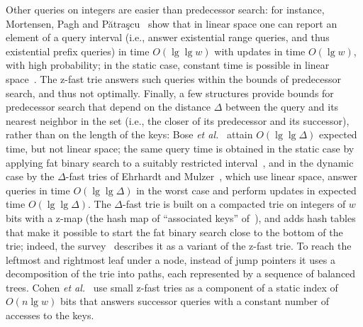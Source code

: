 \documentclass[a4paper]{article}
\newcommand{\?}{\mskip1.5mu}
\begin{document}
Other queries on integers are easier than predecessor search: for instance, Mortensen, Pagh and P\u{a}tra\c{s}cu~\cite{Mortensen2005Dynamic} 
show that in linear space one can report an element of a query interval (i.e., answer existential range queries, and thus existential prefix
queries) in time $O(\lg\lg w)$ with updates in time $O(\lg w)$, with high probability; in the static case, constant time is possible in linear space~\cite{Alstrup2001Optimal}. The z-fast trie answers 
such queries within the bounds of predecessor search, and thus not optimally.
Finally, a few structures provide bounds for predecessor search that depend on the distance $\Delta$ between the query and its nearest neighbor in the set (i.e., the closer of its predecessor and its successor),
rather than on the length of the keys: Bose \textit{et al.}~\cite{Bose2013Fast} attain $O(\lg\lg\Delta)$ expected time, but not linear space; 
the same query time is obtained in the static case by applying fat binary search to a suitably restricted interval~\cite{Belazzougui2012Predecessor},
and in the dynamic case by the $\Delta$-fast tries of Ehrhardt and Mulzer~\cite{Ehrhardt2017Delta}, which use linear space, 
answer queries in time $O(\lg\lg\Delta)$ in the worst case and perform updates in expected time $O(\lg\lg\Delta)$. 
The $\Delta$-fast trie is built on a compacted trie on integers of $w$ bits with a z-map (the hash map of ``associated keys'' of~\cite{Ehrhardt2017Delta}), 
and adds hash tables that make it possible to start the fat binary search close to the bottom of the trie; indeed, the 
survey~\cite{Navarro2020Predecessor} describes it as a variant of the z-fast trie. 
To reach the leftmost and rightmost leaf under a node, instead of jump pointers it uses a decomposition of the trie into paths, each represented by a sequence of balanced trees. 
Cohen \textit{et al.}~\cite{Cohen2015Minimal} use small z-fast tries as a component of a static index of $O(n\lg w)$ bits that answers successor queries 
with a constant number of accesses to the keys.
\end{document}
